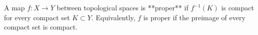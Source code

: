 A map $f: X \to Y$ between topological spaces is **proper** if $f^{-1}(K)$ is compact for every compact set $K \subset Y$. Equivalently, $f$ is proper if the preimage of every compact set is compact.
